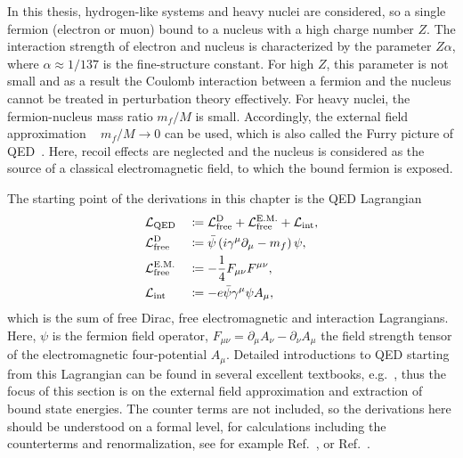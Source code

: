 In this thesis, hydrogen-like systems and heavy nuclei are considered, so a single fermion (electron or muon) bound to a nucleus with a high charge number $Z$. The interaction strength of electron and nucleus is characterized by the parameter $Z\alpha$, where $\alpha \approx 1/137$ is the fine-structure constant. For high $Z$, this parameter is not small and as a result the Coulomb interaction between a fermion and the nucleus cannot be treated in perturbation theory effectively. 
For heavy nuclei, the fermion-nucleus mass ratio $m_f/M$ is small. Accordingly, the external field approximation ~\cite[\mbox{Section~13.6}]{weinberg2005} $m_f/M \rightarrow 0$ can be used, which is also called the Furry picture of QED~\cite{furry1951}. Here, recoil effects are neglected and the nucleus is considered as the source of a classical electromagnetic field, to which the bound fermion is exposed.

The starting point of the derivations in this chapter is the QED Lagrangian 
\begin{alignat}{2}
\label{eq:Lqed}
&\mathcal{L}_{\text{QED}}&&\coloneqq \mathcal{L}_{\text{free}}^{\text{D}} + \mathcal{L}_{\text{free}}^{\text{E.M.}} + \mathcal{L}_{\text{int}}, \\
&\mathcal{L}_{\text{free}}^{\text{D}} &&\coloneqq\bar{\psi}\left( i \gamma^\mu \partial_\mu -m_f \right)\psi,\\ 
&\mathcal{L}_{\text{free}}^{\text{E.M.}} &&\coloneqq -\frac{1}{4}F_{\mu\nu}F^{\mu\nu},\\
&\mathcal{L}_{\text{int}}&&\coloneqq -e\bar{\psi}\gamma^\mu \psi A_\mu,\notag
\end{alignat}
which is the sum of free Dirac, free electromagnetic and interaction Lagrangians. Here, $\psi$ is the fermion field operator, $F_{\mu\nu}=\partial_\mu A_\nu - \partial_\nu A_\mu$ the field strength tensor of the electromagnetic four-potential $A_\mu$. Detailed introductions to QED starting from this Lagrangian can be found in several excellent textbooks, e.g.~\cite{weinberg2005,itzykson2005,peskin1995}, thus the focus of this section is on the external field approximation and extraction of bound state energies. The counter terms are not included, so the derivations here should be understood on a formal level, for calculations including the counterterms and renormalization, see for example Ref.~\cite[Section 14]{weinberg2005}, or Ref.~\cite{shabaev2002_2}.

